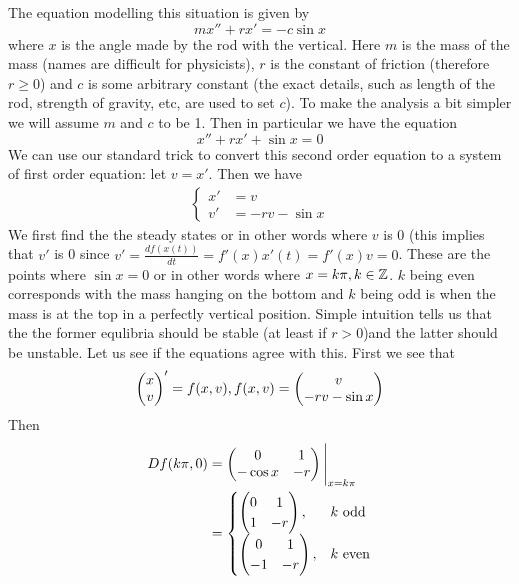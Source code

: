 
The equation modelling this situation is given by
\begin{equation*}
    mx'' + rx' = -c \sin x
\end{equation*}
where $x$ is the angle made by the rod with the vertical. Here $m$ is the mass of the mass (names are difficult for physicists), $r$ is the constant of friction (therefore $r \geq 0$) and $c$ is some arbitrary constant (the exact details, such as length of the rod, strength of gravity, etc, are used to set $c$). To make the analysis a bit simpler we will assume $m$ and $c$ to be 1. Then in particular we have the equation
\begin{equation}
    x'' + rx' + \sin x = 0
\end{equation}
We can use our standard trick to convert this second order equation to a system of first order equation: let $v = x'$. Then we have
\begin{align*}
    \begin{cases}
    x' &= v\\
    v' &= -rv - \sin x
    \end{cases}
\end{align*}
We first find the the steady states or in other words where $v$ is 0 (this implies that $v'$ is 0 since $v' = \frac{df(x(t))}{dt} = f'(x) x'(t) = f'(x) v = 0$. These are the points where $\sin x = 0$ or in other words where $x = k\pi, k \in \mathbb{Z}$. $k$ being even corresponds with the mass hanging on the bottom and $k$ being odd is when the mass is at the top in a perfectly vertical position. Simple intuition tells us that the the former equlibria should be stable (at least if $r > 0$)and the latter should be unstable. Let us see if the equations agree with this. First we see that 
$$ \begin{pmatrix} x\\v \end{pmatrix}' = f(x,v), f(x, v) = \begin{pmatrix} v\\-rv - \sin x \end{pmatrix}$$
Then
\begin{align*}
    Df(k\pi, 0) &= \begin{pmatrix} 0 & 1\\-\cos x & -r \end{pmatrix}\Bigg|_{x = k\pi}\\
    &= 
    \begin{cases}
    \begin{pmatrix} 0 & 1\\1 & -r \end{pmatrix}, &k \text{ odd}\\
    \begin{pmatrix} 0 & 1\\-1 & -r \end{pmatrix}, &k \text{ even}
    \end{cases}
\end{align*}

